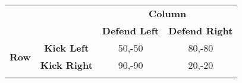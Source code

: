 \documentclass{standalone}
\begin{document}
\begin{tabular}{rccc}
& & \multicolumn{2}{c}{\textbf{Column}} \\
& & \textbf{Defend Left} & \textbf{Defend Right} \\ 
\cline{3-4}
\multirow{2}{*}{\textbf{Row}}& \textbf{Kick Left} & \multicolumn{1}{|c|}{50,-50} & \multicolumn{1}{c|}{80,-80} \\ 
\cline{3-4}
& \textbf{Kick Right} & \multicolumn{1}{|c|}{90,-90} & \multicolumn{1}{c|}{20,-20} \\ 
\cline{3-4}\\
\end{tabular}
\end{document}
